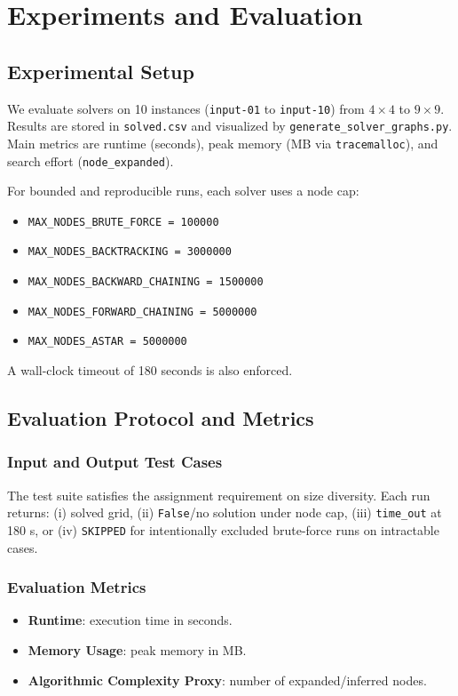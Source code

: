 \section{Experiments and Evaluation}

\subsection{Experimental Setup}
We evaluate solvers on 10 instances (\texttt{input-01} to \texttt{input-10}) from \(4 \times 4\) to \(9 \times 9\). Results are stored in \texttt{solved.csv} and visualized by \texttt{generate\_solver\_graphs.py}. Main metrics are runtime (seconds), peak memory (MB via \texttt{tracemalloc}), and search effort (\texttt{node\_expanded}).

For bounded and reproducible runs, each solver uses a node cap:
\begin{itemize}
\item \texttt{MAX\_NODES\_BRUTE\_FORCE = 100000}
\item \texttt{MAX\_NODES\_BACKTRACKING = 3000000}
\item \texttt{MAX\_NODES\_BACKWARD\_CHAINING = 1500000}
\item \texttt{MAX\_NODES\_FORWARD\_CHAINING = 5000000}
\item \texttt{MAX\_NODES\_ASTAR = 5000000}
\end{itemize}
A wall-clock timeout of 180 seconds is also enforced.

\subsection{Evaluation Protocol and Metrics}
\subsubsection{Input and Output Test Cases}
The test suite satisfies the assignment requirement on size diversity. Each run returns: (i) solved grid, (ii) \texttt{False}/no solution under node cap, (iii) \texttt{time\_out} at 180 s, or (iv) \texttt{SKIPPED} for intentionally excluded brute-force runs on intractable cases.

\subsubsection{Evaluation Metrics}
\begin{itemize}
\item \textbf{Runtime}: execution time in seconds.
\item \textbf{Memory Usage}: peak memory in MB.
\item \textbf{Algorithmic Complexity Proxy}: number of expanded/inferred nodes.
\end{itemize}

